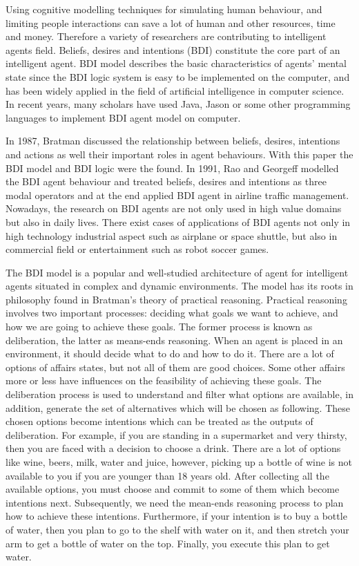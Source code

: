 Using cognitive modelling techniques for simulating human behaviour, and limiting people interactions can save a lot of human and other resources, time and money. Therefore a variety of researchers are contributing to intelligent agents field. Beliefs, desires and intentions (BDI) constitute the core part of an intelligent agent. BDI model describes the basic characteristics of agents' mental state since the BDI logic system is easy to be implemented on the computer, and has been widely applied in the field of artificial intelligence in computer science. In recent years, many scholars have used Java, Jason or some other programming languages to implement BDI agent model on computer.

In 1987, Bratman\cite{MICHAEL_PlansResource_1988} discussed the relationship between beliefs, desires, intentions and actions as well their important roles in agent behaviours. With this paper the BDI model and BDI logic were the found. In 1991, Rao and Georgeff\cite{Michael_BDIAgency_1999} modelled the BDI agent behaviour and treated beliefs, desires and intentions as three modal operators and at the end applied BDI agent in airline traffic management. Nowadays, the research on BDI agents are not only used in high value domains but also in daily lives. There exist cases of applications of BDI agents not only in high technology industrial aspect such as airplane or space shuttle, but also in commercial field or entertainment such as robot soccer games.

The BDI model is a popular and well-studied architecture of agent for intelligent agents situated in complex and dynamic environments. The model has its roots in philosophy found in Bratman’s theory of practical reasoning\cite{Sebastian_Hierarchical_2006}. Practical reasoning involves two important processes: deciding what goals we want to achieve, and how we are going to achieve these goals. The former process is known as deliberation, the latter as means-ends reasoning\cite{Gerhard_MultiSystem_1999}. When an agent is placed in an environment, it should decide what to do and how to do it. There are a lot of options of affairs states, but not all of them are good choices. Some other affairs more or less have influences on the feasibility of achieving these goals. The deliberation process is used to understand and filter what options are available, in addition, generate the set of alternatives which will be chosen as following. These chosen options become intentions which can be treated as the outputs of deliberation. For example, if you are standing in a supermarket and very thirsty, then you are faced with a decision to choose a drink. There are a lot of options like wine, beers, milk, water and juice, however, picking up a bottle of wine is not available to you if you are younger than 18 years old. After collecting all the available options, you must choose and commit to some of them which become intentions next. Subsequently, we need the mean-ends reasoning process to plan how to achieve these intentions. Furthermore, if your intention is to buy a bottle of water, then you plan to go to the shelf with water on it, and then stretch your arm to get a bottle of water on the top. Finally, you execute this plan to get water.

